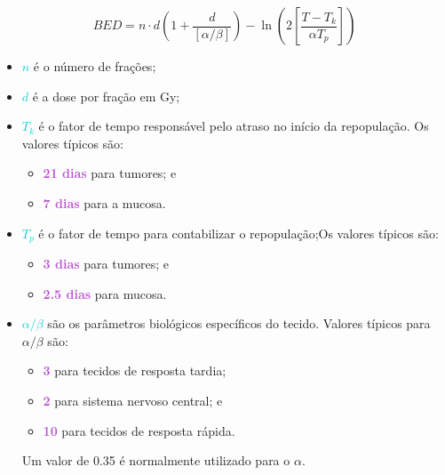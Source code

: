 \documentclass[11pt,a4paper]{article}
\newcounter{exemplo}
\begin{document}
	\begin{equation}
		BED = n \cdot d \left(1 + \frac{d}{[\alpha / \beta]}\right) - \ln \left(2 \left[\frac{T - T_k}{\alpha T_p}\right]\right)
	\end{equation}

	\begin{exemplo}[onde,]
		\begin{itemize}[label=\textcolor{CarnationPink}{$\blacksquare$}]
			\item \textcolor{DarkTurquoise}{\textbf{$n$}} é o número de frações;
			\item \textcolor{DarkTurquoise}{\textbf{$d$}} é a dose por fração em Gy;
			\item \textcolor{DarkTurquoise}{\textbf{$T_k$}} é o fator de tempo responsável pelo atraso no início da repopulação. Os valores típicos são:
				\begin{itemize}[label=\textcolor{CarnationPink}{$\star$}]
					\item \textcolor{MediumOrchid}{\textbf{21 dias}} para tumores; e
					\item \textcolor{MediumOrchid}{\textbf{7 dias}} para a mucosa.
				\end{itemize}
			\item \textcolor{DarkTurquoise}{\textbf{$T_p$}} é o fator de tempo para contabilizar o repopulação;Os valores típicos são:
				\begin{itemize}[label=\textcolor{CarnationPink}{$\star$}]
					\item \textcolor{MediumOrchid}{\textbf{3 dias}} para tumores; e
					\item \textcolor{MediumOrchid}{\textbf{2.5 dias}} para mucosa.
				\end{itemize}
			\item \textcolor{DarkTurquoise}{\textbf{$\alpha / \beta$}} são os parâmetros biológicos específicos do tecido. Valores típicos para $\alpha / \beta$ são:
				\begin{itemize}[label=\textcolor{CarnationPink}{$\star$}]
					\item \textcolor{MediumOrchid}{\textbf{3}} para tecidos de resposta tardia;
					\item \textcolor{MediumOrchid}{\textbf{2}} para sistema nervoso central; e
					\item \textcolor{MediumOrchid}{\textbf{10}} para tecidos de resposta rápida.
				\end{itemize}
			Um valor de 0.35 é normalmente utilizado para o $\alpha$.
		\end{itemize}
	\end{exemplo}
\end{document}
